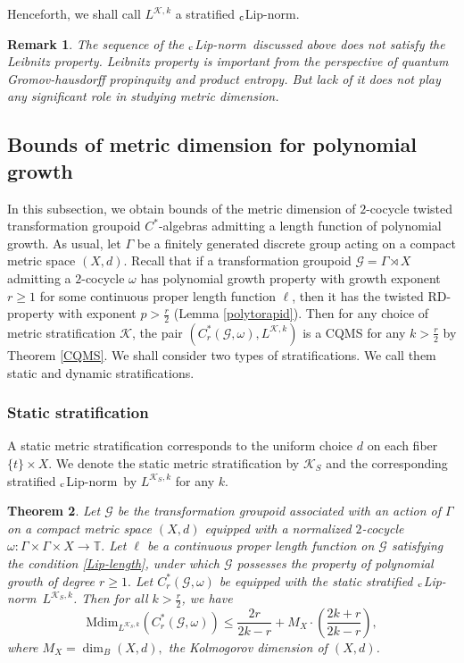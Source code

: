 \documentclass[a4paper,11pt,reqno]{amsart}
\theoremstyle{plain}
\newtheorem{thm}{Theorem}[section]
\newtheorem{rem}[thm]{Remark}
\theoremstyle{mainthmstyle}
\theoremstyle{named}
\numberwithin{equation}{section}
\newcommand{\clipnorm}{$_{\text{\rm c}}$Lip-norm}
\begin{document}
Henceforth, we shall call $L^{\mathcal K, k}$ a stratified \clipnorm.
\begin{rem}\label{noleibnitz}
    The sequence of the \clipnorm\ discussed above does not satisfy the Leibnitz property. Leibnitz property is important from the perspective of quantum Gromov-hausdorff propinquity and product entropy. But lack of it does not play any significant role in studying metric dimension.
\end{rem}
\subsection{Bounds of metric dimension for polynomial growth} In this subsection, we obtain bounds of the metric dimension of $2$-cocycle twisted transformation groupoid $C^{\ast}$-algebras admitting a length function of polynomial growth. As usual, let $\Gamma$ be a finitely generated discrete group acting on a compact metric space $(X,d)$. Recall that if a transformation groupoid $\mathcal{G}=\Gamma\rtimes X$ admitting a $2$-cocycle $\omega$ has polynomial growth property with growth exponent $r\geq 1$ for some continuous proper length function $\ell$, then it has the twisted RD-property with exponent $p>\frac{r}{2}$ (Lemma \ref{polytorapid}). Then for any choice of metric stratification $\mathcal{K}$, the pair $(C^{\ast}_{r}(\mathcal{G},\omega),L^{\mathcal{K},k})$ is a CQMS for any $k>\frac{r}{2}$ by Theorem \ref{CQMS}. We shall consider two types of stratifications. We call them static and dynamic stratifications. 
 \subsubsection{Static stratification} \label{static_stratification}  A static metric stratification corresponds to the uniform choice $d$ on each fiber $\{t\}\times X$. We denote the static metric stratification by $\mathcal{K}_{S}$ and the corresponding stratified \clipnorm\ by $L^{\mathcal{K}_{S},k}$ for any $k$. 
\begin{thm} \label{general cocycle bound}
Let $\mathcal{G}$ be the transformation groupoid associated with an action of $\Gamma$ on a compact metric space $(X, d)$ equipped with a normalized $2$-cocycle $\omega : \Gamma \times \Gamma \times X \rightarrow \mathbb T.$ Let $\ell$ be a continuous proper length function on $\mathcal G$ satisfying the condition \eqref{Lip-length}, under which $\mathcal G$ possesses the property of polynomial growth of degree $r \geq 1.$ Let $C_r^{\ast}(\mathcal {G}, \omega)$ be equipped with the static stratified \clipnorm\ $L^{\mathcal{K}_{S}, k}$. Then for all $k > \frac{r}{2}$, we have
\begin{displaymath}\mathrm{Mdim}_{L^{\mathcal{K}_{S},k}} (C_r^{\ast}(\mathcal{G}, \omega)) \leq \frac {2 r} {2 k - r} + M_X \cdot \left (\frac {2 k + r} {2 k - r} \right ), \end{displaymath}
where $M_X = \dim_B (X, d),$ the Kolmogorov dimension of $(X,d)$.
\end{thm}
\end{document}
